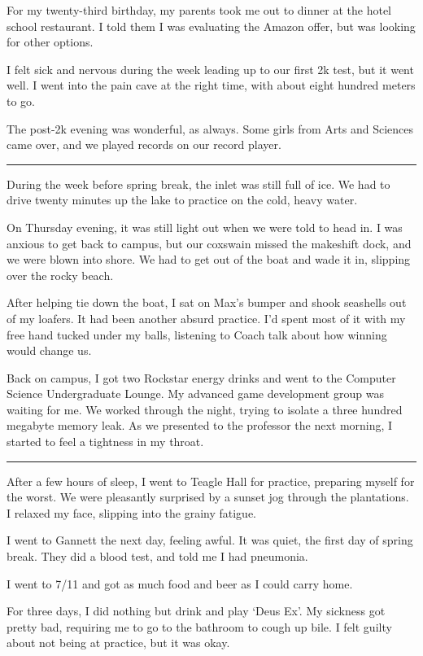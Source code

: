 For my twenty-third birthday, my parents took me out to dinner at the hotel
school restaurant.  I told them I was evaluating the Amazon offer, but was
looking for other options.

I felt sick and nervous during the week leading up to our first 2k test, but it
went well.  I went into the pain cave at the right time, with about eight
hundred meters to go.

The post-2k evening was wonderful, as always.  Some girls from Arts and Sciences
came over, and we played records on our record player.

\plainfancybreak{12pt}{2}{}

During the week before spring break, the inlet was still full of ice.  We had to
drive twenty minutes up the lake to practice on the cold, heavy water.

On Thursday evening, it was still light out when we were told to head in.  I was
anxious to get back to campus, but our coxswain missed the makeshift dock, and
we were blown into shore.  We had to get out of the boat and wade it in,
slipping over the rocky beach.

After helping tie down the boat, I sat on Max's bumper and shook seashells out
of my loafers.  It had been another absurd practice.  I'd spent most of it with
my free hand tucked under my balls, listening to Coach talk about how winning
would change us.

Back on campus, I got two Rockstar energy drinks and went to the Computer
Science Undergraduate Lounge.  My advanced game development group was waiting
for me.  We worked through the night, trying to isolate a three hundred megabyte
memory leak.  As we presented to the professor the next morning, I started to
feel a tightness in my throat.

\plainfancybreak{12pt}{2}{}

After a few hours of sleep, I went to Teagle Hall for practice, preparing myself
for the worst.  We were pleasantly surprised by a sunset jog through the
plantations.  I relaxed my face, slipping into the grainy fatigue.

I went to Gannett the next day, feeling awful.  It was quiet, the first day of
spring break.  They did a blood test, and told me I had pneumonia.

I went to 7/11 and got as much food and beer as I could carry home.

For three days, I did nothing but drink and play `Deus Ex'.  My sickness got
pretty bad, requiring me to go to the bathroom to cough up bile.  I felt guilty
about not being at practice, but it was okay.

